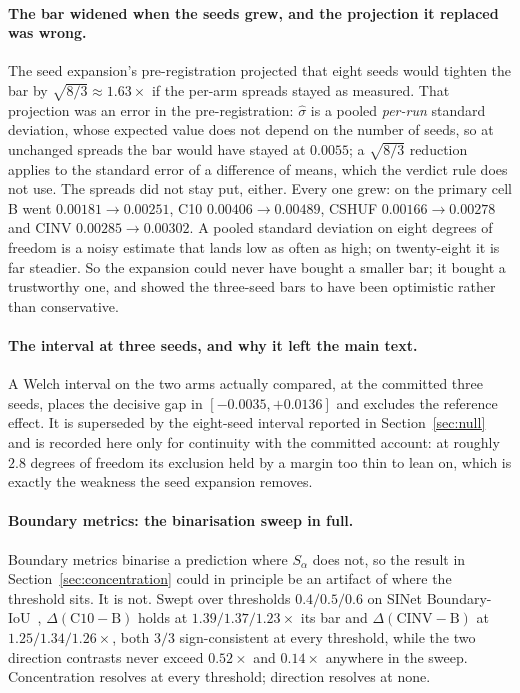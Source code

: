 \documentclass{article}
\begin{document}
\paragraph{The bar widened when the seeds grew, and the projection it replaced was wrong.} The seed
expansion's pre-registration projected that eight seeds would tighten the bar by
$\sqrt{8/3} \approx 1.63\times$ if the per-arm spreads stayed as measured. That projection was an
error in the pre-registration: $\hat{\sigma}$ is a pooled \emph{per-run} standard deviation, whose
expected value does not depend on the number of seeds, so at unchanged spreads the bar would have
stayed at $0.0055$; a $\sqrt{8/3}$ reduction applies to the standard error of a difference of means,
which the verdict rule does not use. The spreads did not stay put, either. Every one grew: on the
primary cell B went $0.00181 \rightarrow 0.00251$, C10 $0.00406 \rightarrow 0.00489$, CSHUF
$0.00166 \rightarrow 0.00278$ and CINV $0.00285 \rightarrow 0.00302$. A pooled standard deviation
on eight degrees of freedom is a noisy estimate that lands low as often as high; on twenty-eight it
is far steadier. So the expansion could never have bought a smaller bar; it bought a trustworthy
one, and showed the three-seed bars to have been optimistic rather than conservative.



\paragraph{The interval at three seeds, and why it left the main text.} A Welch interval on the two
arms actually compared, at the committed three seeds, places the decisive gap in
$[-0.0035, +0.0136]$ and excludes the reference effect. It is superseded by the eight-seed interval
reported in Section~\ref{sec:null} and is recorded here only for continuity with the committed
account: at roughly $2.8$ degrees of freedom its exclusion held by a margin too thin to lean on,
which is exactly the weakness the seed expansion removes.

\paragraph{Boundary metrics: the binarisation sweep in full.} Boundary metrics binarise a
prediction where $S_\alpha$ does not, so the result in Section~\ref{sec:concentration} could in
principle be an artifact of where the threshold sits. It is not. Swept over thresholds
$0.4 / 0.5 / 0.6$ on SINet Boundary-IoU~\citep{cheng2021boundary}, $\Delta(\mathrm{C10}-\mathrm{B})$ holds at
$1.39 / 1.37 / 1.23 \times$ its bar and $\Delta(\mathrm{CINV}-\mathrm{B})$ at
$1.25 / 1.34 / 1.26 \times$, both $3/3$ sign-consistent at every threshold, while the two direction
contrasts never exceed $0.52\times$ and $0.14\times$ anywhere in the sweep. Concentration resolves
at every threshold; direction resolves at none.
\end{document}
